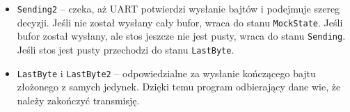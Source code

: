 \begin{itemize}
  \item \texttt{Sending2} -- czeka, aż UART potwierdzi wysłanie bajtów i podejmuje szereg decyzji. Jeśli nie został wysłany cały bufor, wraca do stanu \texttt{MockState}. Jeśli bufor został wysłany, ale stos jeszcze nie jest pusty, wraca do stanu \texttt{Sending}. Jeśli stos jest pusty przechodzi do stanu \texttt{LastByte}.
  \item \texttt{LastByte} i \texttt{LastByte2} -- odpowiedzialne za wysłanie kończącego bajtu złożonego z samych jedynek. Dzięki temu program odbierający dane wie, że należy zakończyć transmisję.
\end{itemize}
